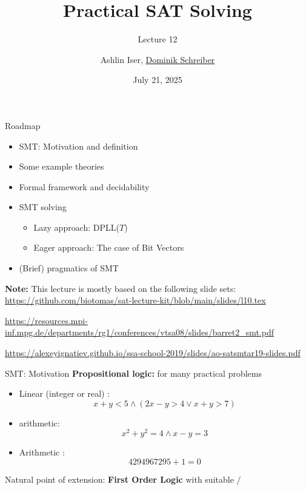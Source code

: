 \documentclass[t,english]{sdqbeamer}
\title{Practical SAT Solving}
\subtitle{Lecture 12 \unimp{\normalfont -- Satisfiability Modulo Theories (SMT)}}
\author{{Ashlin Iser}, \underline{Dominik Schreiber}}
\date{July 21, 2025}
\begin{document}
\begin{frame}[title white horizontal, picture=logos/blender-render, kitlogo=rgb]
	\titlepage
\end{frame}







\begin{frame}{Roadmap}
	
	\vspace*{-3mm}
	\begin{itemize}
		\item SMT: Motivation and definition
		\item Some example theories
		\item Formal framework and decidability
		\item SMT solving
		\begin{itemize}
			\item Lazy approach: DPLL($T$)
			\item Eager approach: The case of Bit Vectors
		\end{itemize}
		\item (Brief) pragmatics of SMT
	\end{itemize}
	
	\vspace*{8mm}
	
	\small
	\textbf{Note:} This lecture is mostly based on the following slide sets:\\
	
	\vspace*{2mm}
	\url{https://github.com/biotomas/sat-lecture-kit/blob/main/slides/l10.tex}\\
	\hfill{}
	
	\vspace*{2mm}
	\url{https://resources.mpi-inf.mpg.de/departments/rg1/conferences/vtsa08/slides/barret2_smt.pdf}\\
	\hfill{}
	
	\vspace*{2mm}
	\url{https://alexeyignatiev.github.io/ssa-school-2019/slides/ao-satsmtar19-slides.pdf}\\
	\hfill{}
\end{frame}

\begin{frame}{SMT: Motivation}
	\textbf{Propositional logic:}  for many practical problems
	\begin{itemize}
		\item Linear (integer or real) :
		\[ x+y < 5 \wedge (2x-y > 4 \vee x+y > 7) \]
		\item {} arithmetic:
		\[ x^2 + y^2 = 4 \wedge x-y = 3 \]
		\item Arithmetic :
		\[ 4294967295 + 1 = 0 \]
	\end{itemize}
	Natural point of extension: \textbf{First Order Logic} with suitable  / 
\end{frame}
\end{document}
